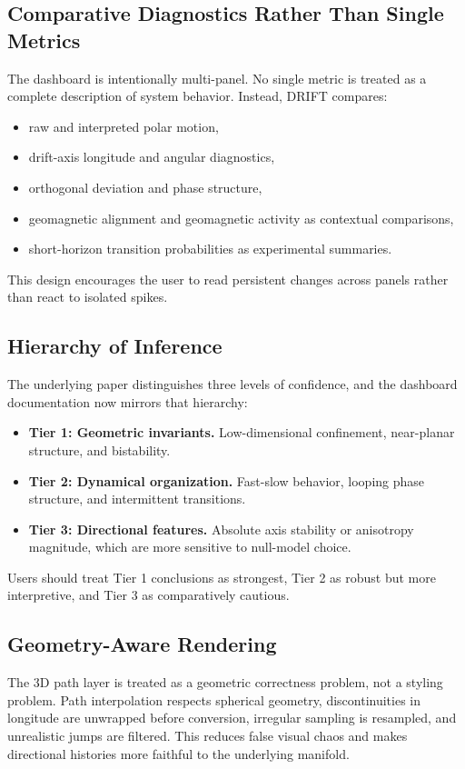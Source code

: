\documentclass[11pt]{article}
\begin{document}
\subsection{Comparative Diagnostics Rather Than Single Metrics}
The dashboard is intentionally multi-panel. No single metric is treated as a complete description of system behavior. Instead, DRIFT compares:
\begin{itemize}[leftmargin=1.5em]
  \item raw and interpreted polar motion,
  \item drift-axis longitude and angular diagnostics,
  \item orthogonal deviation and phase structure,
  \item geomagnetic alignment and geomagnetic activity as contextual comparisons,
  \item short-horizon transition probabilities as experimental summaries.
\end{itemize}

This design encourages the user to read persistent changes across panels rather than react to isolated spikes.

\subsection{Hierarchy of Inference}
The underlying paper distinguishes three levels of confidence, and the dashboard documentation now mirrors that hierarchy:
\begin{itemize}[leftmargin=1.5em]
  \item \textbf{Tier 1: Geometric invariants.} Low-dimensional confinement, near-planar structure, and bistability.
  \item \textbf{Tier 2: Dynamical organization.} Fast-slow behavior, looping phase structure, and intermittent transitions.
  \item \textbf{Tier 3: Directional features.} Absolute axis stability or anisotropy magnitude, which are more sensitive to null-model choice.
\end{itemize}

Users should treat Tier 1 conclusions as strongest, Tier 2 as robust but more interpretive, and Tier 3 as comparatively cautious.

\subsection{Geometry-Aware Rendering}
The 3D path layer is treated as a geometric correctness problem, not a styling problem. Path interpolation respects spherical geometry, discontinuities in longitude are unwrapped before conversion, irregular sampling is resampled, and unrealistic jumps are filtered. This reduces false visual chaos and makes directional histories more faithful to the underlying manifold.
\end{document}
